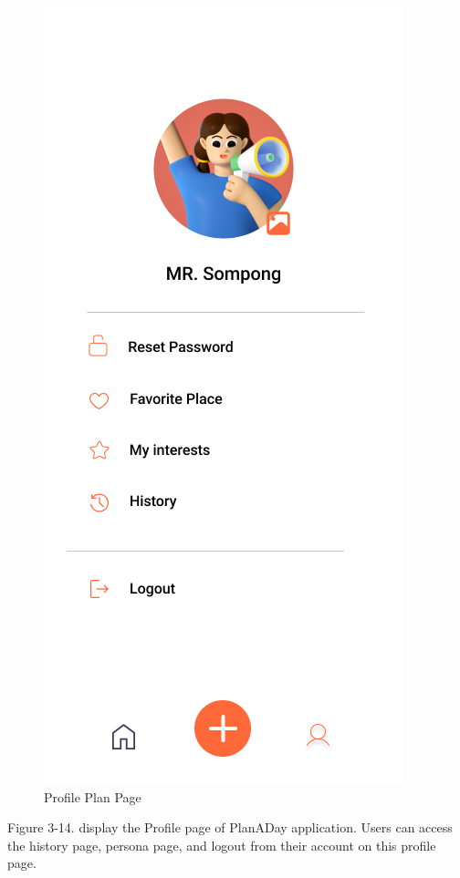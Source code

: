\newpage
\begin{figure}[!h]
    \centering
    \includegraphics[width=0.5\linewidth]{chapter3/UI_User_Profile.png}
    \caption{Profile Plan Page}
    \label{fig:Profile Plan Page}
\end{figure}
\noindent
Figure 3-14. display the Profile page of PlanADay application. Users can access the
history page, persona page, and logout from their account on this profile page.

